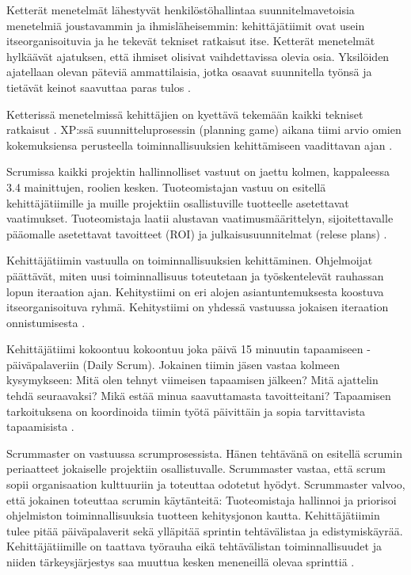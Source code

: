 \documentclass[finnish]{tktltiki2}
\theoremstyle{definition}
\theoremstyle{remark}
\begin{document}
Ketterät menetelmät lähestyvät henkilöstöhallintaa suunnitelmavetoisia menetelmiä joustavammin ja ihmisläheisemmin: kehittäjätiimit ovat usein itseorganisoituvia ja he tekevät tekniset ratkaisut itse. Ketterät menetelmät hylkäävät ajatuksen, että ihmiset olisivat vaihdettavissa olevia osia. Yksilöiden ajatellaan olevan päteviä ammattilaisia, jotka osaavat suunnitella työnsä ja tietävät keinot saavuttaa paras tulos \cite{FOW01a}.

Ketterissä menetelmissä kehittäjien on kyettävä tekemään kaikki tekniset ratkaisut \cite{FOW01a}. XP:ssä suunnitteluprosessin (planning game) aikana tiimi arvio omien kokemuksiensa perusteella toiminnallisuuksien kehittämiseen vaadittavan ajan \cite{BEC99}.

Scrumissa kaikki projektin hallinnolliset vastuut on jaettu kolmen, kappaleessa 3.4 mainittujen, roolien kesken. Tuoteomistajan vastuu on esitellä kehittäjätiimille ja muille projektiin osallistuville tuotteelle asetettavat vaatimukset. Tuoteomistaja laatii alustavan vaatimusmäärittelyn, sijoitettavalle pääomalle asetettavat tavoitteet (ROI) ja julkaisusuunnitelmat (relese plans) \cite{SCH09}.

Kehittäjätiimin vastuulla on toiminnallisuuksien kehittäminen. Ohjelmoijat päättävät, miten uusi toiminnallisuus toteutetaan ja työskentelevät rauhassan lopun iteraation ajan. Kehitystiimi on eri alojen asiantuntemuksesta koostuva itseorganisoituva ryhmä. Kehitystiimi on yhdessä vastuussa jokaisen iteraation onnistumisesta \cite{SCH09}.

Kehittäjätiimi kokoontuu kokoontuu joka päivä 15 minuutin tapaamiseen - päiväpalaveriin (Daily Scrum). Jokainen tiimin jäsen vastaa kolmeen kysymykseen: Mitä olen tehnyt viimeisen tapaamisen jälkeen? Mitä ajattelin tehdä seuraavaksi? Mikä estää minua saavuttamasta tavoitteitani? Tapaamisen tarkoituksena on koordinoida tiimin työtä päivittäin ja sopia tarvittavista tapaamisista \cite{SCH09}.

Scrummaster on vastuussa scrumprosessista. Hänen tehtävänä on esitellä scrumin periaatteet jokaiselle projektiin osallistuvalle. Scrummaster vastaa, että scrum sopii organisaation kulttuuriin ja toteuttaa odotetut hyödyt. Scrummaster valvoo, että jokainen toteuttaa scrumin käytänteitä: Tuoteomistaja hallinnoi ja priorisoi ohjelmiston toiminnallisuuksia tuotteen kehitysjonon kautta. Kehittäjätiimin tulee pitää päiväpalaverit sekä ylläpitää sprintin tehtävälistaa ja edistymiskäyrää. Kehittäjätiimille on taattava työrauha eikä tehtävälistan toiminnallisuudet ja niiden tärkeysjärjestys saa muuttua kesken meneneillä olevaa sprinttiä \cite{SCH09}.
\end{document}

